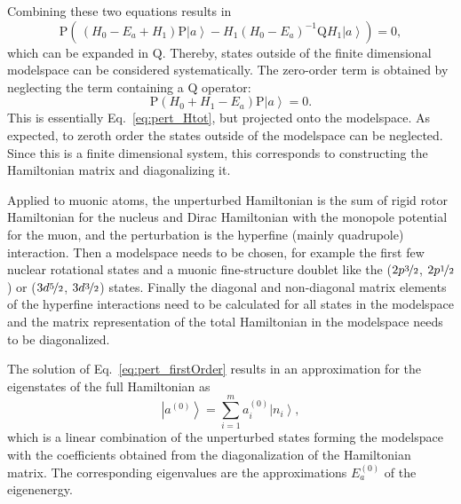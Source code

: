 Combining these two equations results in
\begin{equation}
\text{P}\left( \,
(H_0-E_a+H_1)\text{P}\left|a\right>
- H_1(H_0-E_a)^{-1}\text{Q}H_1\left|a\right>
\right) = 0,
\label{eq:pert_projectionEq}
\end{equation}
which can be expanded in $\text{Q}$. Thereby, states outside of the finite dimensional modelspace can be considered systematically. The zero-order term is obtained by neglecting the term containing a $\text{Q}$ operator:
\begin{equation}
\label{eq:pert_firstOrder}
\text{P}\left(H_0+H_1-E_a\right) \text{P}\left|a\right> = 0.
\end{equation}
This is essentially Eq.~\eqref{eq:pert_Htot}, but projected onto the modelspace. As expected, to zeroth order the states outside of the modelspace can be neglected. Since this is a finite dimensional system, this corresponds to constructing the Hamiltonian matrix and diagonalizing it.

Applied to muonic atoms, the unperturbed Hamiltonian is the sum of rigid rotor Hamiltonian for the nucleus and Dirac Hamiltonian with the monopole potential for the muon, and the perturbation is the hyperfine (mainly quadrupole) interaction. Then a modelspace needs to be chosen, for example the first few nuclear rotational states and a muonic fine-structure doublet like the ($2p\nicefrac{3}{2}$, $2p\nicefrac{1}{2}$) or ($3d\nicefrac{5}{2}$, $3d\nicefrac{3}{2}$) states. Finally the diagonal and non-diagonal matrix elements of the hyperfine interactions need to be calculated for all states in the modelspace and the matrix representation of the total Hamiltonian in the modelspace needs to be diagonalized.

The solution of Eq.~\eqref{eq:pert_firstOrder} results in an approximation for the eigenstates of the full Hamiltonian as
\begin{equation}
\label{eq:pert_firstOrderState}
\left|a^{(0)}\right> = \sum_{i=1}^m a_i^{(0)}\left|n_i\right>,
\end{equation}
which is a linear combination of the unperturbed states forming the modelspace with the coefficients obtained from the diagonalization of the Hamiltonian matrix. The corresponding eigenvalues are the approximations $E_a^{(0)}$ of the eigenenergy.

